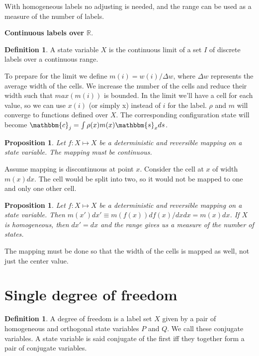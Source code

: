 \documentclass[twocolumn,floatfix,nofootinbib]{revtex4}   %
\theoremstyle{theorem}
\newtheorem{prop}[thm]{Proposition}
\theoremstyle{definition}
\newtheorem{defn}[thm]{Definition}
\begin{document}
With homogeneous labels no adjusting is needed, and the range can be used as a measure of the number of labels.

\textbf{Continuous labels over $\mathbb{R}$}.

\begin{defn}\label{continuousLabels}
A state variable $X$ is the continuous limit of a set $I$ of discrete labels over a continuous range.
\end{defn}

To prepare for the limit we define $m(i)=w(i)/\Delta w$, where $\Delta w$ represents the average width of the cells. We increase the number of the cells and reduce their width such that $max(m(i))$ is bounded. In the limit we'll have a cell for each value, so we can use $x(i)$ (or simply x) instead of $i$ for the label. $\rho$ and $m$ will converge to functions defined over $X$. The corresponding configuration state will become $\mathbbm{c}_j=\int \rho(x) m(x) \mathbbm{s}_x ds$.

\begin{prop}\label{continuousMapping}
Let $f: X \mapsto X$ be a deterministic and reversible mapping on a state variable. The mapping must be continuous.
\end{prop}
Assume mapping is discontinuous at point $x$. Consider the cell at $x$ of width $m(x)dx$. The cell would be split into two, so it would not be mapped to one and only one other cell.

\begin{prop}\label{widthMapping}
Let $f: X \mapsto X$ be a deterministic and reversible mapping on a state variable. Then $m(x') dx' \equiv m(f(x)) df(x)/dx dx = m(x) dx$. If $X$ is homogeneous, then $dx' = dx$ and the range gives us a measure of the number of states.
\end{prop}
The mapping must be done so that the width of the cells is mapped as well, not just the center value.

\section{Single degree of freedom}

\begin{defn}\label{sdof}
A degree of freedom is a label set $X$ given by a pair of homogeneous and orthogonal state variables $P$ and $Q$. We call these conjugate variables. A state variable is said conjugate of the first iff they together form a pair of conjugate variables.
\end{defn}
\end{document}
